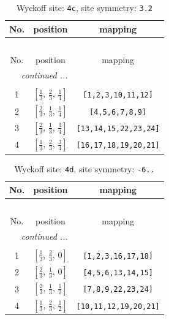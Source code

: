 \documentclass[fleqn,8pt]{jsarticle}
\begin{document}
\renewcommand{\arraystretch}{1.2}
\begin{longtable}{ccc}
\caption{Wyckoff site: {\tt 4c}, site symmetry: {\tt 3.2}}
 \\
 \hline \hline
No. & position & mapping \\ \hline \endfirsthead

\multicolumn{2}{l}{\tablename\ \thetable{}} \\
 \hline \hline
No. & position & mapping \\ \hline \endhead

 \hline \hline
\multicolumn{2}{r}{\footnotesize\it continued ...} \\ \endfoot

 \hline \hline
\multicolumn{2}{r}{} \\ \endlastfoot

1 & $\left[ \frac{1}{3},\, \frac{2}{3},\, \frac{1}{4} \right]$ & {\tt [1,2,3,10,11,12]} \\ \hline
2 & $\left[ \frac{2}{3},\, \frac{1}{3},\, \frac{1}{4} \right]$ & {\tt [4,5,6,7,8,9]} \\ \hline
3 & $\left[ \frac{2}{3},\, \frac{1}{3},\, \frac{3}{4} \right]$ & {\tt [13,14,15,22,23,24]} \\ \hline
4 & $\left[ \frac{1}{3},\, \frac{2}{3},\, \frac{3}{4} \right]$ & {\tt [16,17,18,19,20,21]} \\
\end{longtable}
\renewcommand{\arraystretch}{1.2}
\begin{longtable}{ccc}
\caption{Wyckoff site: {\tt 4d}, site symmetry: {\tt -6..}}
 \\
 \hline \hline
No. & position & mapping \\ \hline \endfirsthead

\multicolumn{2}{l}{\tablename\ \thetable{}} \\
 \hline \hline
No. & position & mapping \\ \hline \endhead

 \hline \hline
\multicolumn{2}{r}{\footnotesize\it continued ...} \\ \endfoot

 \hline \hline
\multicolumn{2}{r}{} \\ \endlastfoot

1 & $\left[ \frac{1}{3},\, \frac{2}{3},\, 0 \right]$ & {\tt [1,2,3,16,17,18]} \\ \hline
2 & $\left[ \frac{2}{3},\, \frac{1}{3},\, 0 \right]$ & {\tt [4,5,6,13,14,15]} \\ \hline
3 & $\left[ \frac{2}{3},\, \frac{1}{3},\, \frac{1}{2} \right]$ & {\tt [7,8,9,22,23,24]} \\ \hline
4 & $\left[ \frac{1}{3},\, \frac{2}{3},\, \frac{1}{2} \right]$ & {\tt [10,11,12,19,20,21]} \\
\end{longtable}
\end{document}
